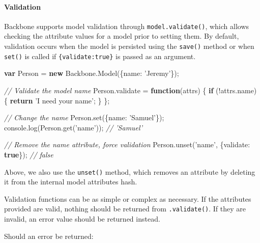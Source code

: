 \documentclass[9pt]{book}
\newenvironment{Shaded}{}{}
\newcommand{\KeywordTok}[1]{\textcolor[rgb]{0.00,0.44,0.13}{\textbf{{#1}}}}
\newcommand{\DataTypeTok}[1]{\textcolor[rgb]{0.56,0.13,0.00}{{#1}}}
\newcommand{\StringTok}[1]{\textcolor[rgb]{0.25,0.44,0.63}{{#1}}}
\newcommand{\CommentTok}[1]{\textcolor[rgb]{0.38,0.63,0.69}{\textit{{#1}}}}
\newcommand{\OtherTok}[1]{\textcolor[rgb]{0.00,0.44,0.13}{{#1}}}
\newcommand{\FunctionTok}[1]{\textcolor[rgb]{0.02,0.16,0.49}{{#1}}}
\newcommand{\NormalTok}[1]{{#1}}
\begin{document}
\paragraph{Validation}\label{validation}

Backbone supports model validation through \texttt{model.validate()},
which allows checking the attribute values for a model prior to setting
them. By default, validation occurs when the model is persisted using
the \texttt{save()} method or when \texttt{set()} is called if
\texttt{\{validate:true\}} is passed as an argument.

\begin{Shaded}
\begin{Highlighting}[]
\KeywordTok{var} \NormalTok{Person = }\KeywordTok{new} \OtherTok{Backbone}\NormalTok{.}\FunctionTok{Model}\NormalTok{(\{}\DataTypeTok{name}\NormalTok{: }\StringTok{'Jeremy'}\NormalTok{\});}

\CommentTok{// Validate the model name}
\OtherTok{Person}\NormalTok{.}\FunctionTok{validate} \NormalTok{= }\KeywordTok{function}\NormalTok{(attrs) \{}
  \KeywordTok{if} \NormalTok{(!}\OtherTok{attrs}\NormalTok{.}\FunctionTok{name}\NormalTok{) \{}
    \KeywordTok{return} \StringTok{'I need your name'}\NormalTok{;}
  \NormalTok{\}}
\NormalTok{\};}

\CommentTok{// Change the name}
\OtherTok{Person}\NormalTok{.}\FunctionTok{set}\NormalTok{(\{}\DataTypeTok{name}\NormalTok{: }\StringTok{'Samuel'}\NormalTok{\});}
\OtherTok{console}\NormalTok{.}\FunctionTok{log}\NormalTok{(}\OtherTok{Person}\NormalTok{.}\FunctionTok{get}\NormalTok{(}\StringTok{'name'}\NormalTok{));}
\CommentTok{// 'Samuel'}

\CommentTok{// Remove the name attribute, force validation}
\OtherTok{Person}\NormalTok{.}\FunctionTok{unset}\NormalTok{(}\StringTok{'name'}\NormalTok{, \{}\DataTypeTok{validate}\NormalTok{: }\KeywordTok{true}\NormalTok{\});}
\CommentTok{// false}
\end{Highlighting}
\end{Shaded}

Above, we also use the \texttt{unset()} method, which removes an
attribute by deleting it from the internal model attributes hash.

Validation functions can be as simple or complex as necessary. If the
attributes provided are valid, nothing should be returned from
\texttt{.validate()}. If they are invalid, an error value should be
returned instead.

Should an error be returned:
\end{document}
